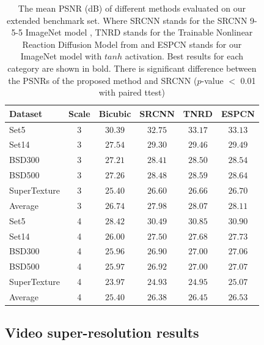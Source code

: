\documentclass[10pt,twocolumn,letterpaper]{article}
\begin{document}
\begin{table}
\footnotesize
\begin{center}
\begin{tabular}{|l|c|c|c|c|c|}
\hline
Dataset & Scale & Bicubic & SRCNN & TNRD & ESPCN \\
\hline\hline
Set5 & 3 & $30.39$ & $32.75$ & $\mathbf{33.17}$ & $33.13$ \\
Set14 & 3 & $27.54$ & $29.30$ & $29.46$ & $\mathbf{29.49}$ \\
BSD300 & 3 & $27.21$ & $28.41$ & $28.50$ & $\mathbf{28.54}$ \\
BSD500 & 3 & $27.26$ & $28.48$ & $28.59$ & $\mathbf{28.64}$ \\
SuperTexture & 3 & $25.40$ & $26.60$ & $26.66$ & $\mathbf{26.70}$ \\
\hline\hline
Average & 3 & $26.74$ & $27.98$ & $28.07$ & $\mathbf{28.11}$ \\
\hline\hline
Set5 & 4 & $28.42$ & $30.49$ & $30.85$ & $\mathbf{30.90}$ \\
Set14 & 4 & $26.00$ & $27.50$ & $27.68$ & $\mathbf{27.73}$ \\
BSD300 & 4 & $25.96$ & $26.90$ & $27.00$ & $\mathbf{27.06}$ \\
BSD500 & 4 & $25.97$ & $26.92$ & $27.00$ & $\mathbf{27.07}$ \\
SuperTexture & 4 & $23.97$ & $24.93$ & $24.95$ & $\mathbf{25.07}$ \\
\hline\hline
Average & 4 & $25.40$ & $26.38$ & $26.45$ & $\mathbf{26.53}$ \\
\hline
\end{tabular}
\end{center}
\caption{The mean PSNR (dB) of different methods evaluated on our extended benchmark set. Where SRCNN stands for the SRCNN 9-5-5 ImageNet model \cite{dong2015image}, TNRD stands for the Trainable Nonlinear Reaction Diffusion Model from \cite{chen2015trainable} and ESPCN stands for our ImageNet model with $tanh$ activation. Best results for each category are shown in bold. There is significant difference between the PSNRs of the proposed method and SRCNN ($p$-value $<$ 0.01 with paired ttest)}
\label{tab:imageresult}
\end{table}

\subsection{Video super-resolution results}
\label{subsection:video}
\end{document}

